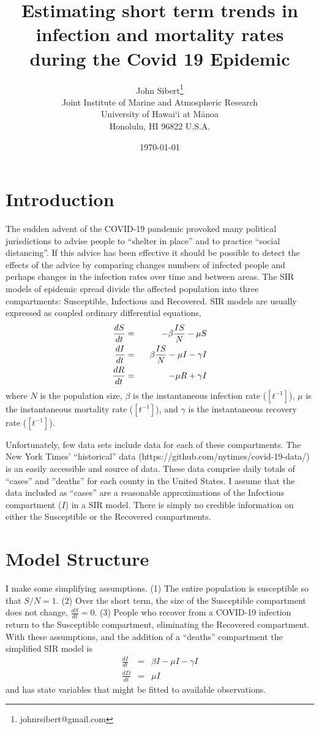 \documentclass[12pt,letterpaper]{article}
\title{Estimating short term trends in infection and mortality rates
during the Covid 19 Epidemic}
\author{
John Sibert\thanks{johnrsibert@gmail.com}\\
Joint Institute of Marine and Atmospheric Research\\
University of Hawai`i at M\={a}noa\\
Honolulu, HI  96822 U.S.A.\\[0.125in]
\date{\today}
}
\newcommand\doublespacing{\baselineskip=1.6\normalbaselineskip}
\begin{document}
\maketitle

\doublespacing

\section*{Introduction}

The sudden advent of the COVID-19 pandemic provoked many political
jurisdictions to advise people to ``shelter in place'' and to practice
``social distancing''. If this advice has been effective it should be
possible to detect the effects of the advice by comparing changes
numbers of infected people and perhaps changes in the infection rates
over time and
between areas. The SIR models of epidemic spread divide the affected
population into three compartments: 
Susceptible, Infectious and Recovered.
SIR models are
usually expressed as coupled ordinary differential equations,
\begin{eqnarray}
\label{eqn:SIR}
\frac{dS}{dt} &=& -\beta\frac{IS}{N} - \mu S\\
\frac{dI}{dt} &=& \hphantom{-}\beta\frac{IS}{N} - \mu I -\gamma I\\
\frac{dR}{dt} &=&  -\mu R +\gamma I
\end{eqnarray}
where $N$ is the population size, $\beta$ is the instantaneous
infection rate ($[t^{-1}]$), $\mu$ is the instantaneous mortality rate
($[t^{-1}]$),  and $\gamma$ is the instantaneous recovery rate
($[t^{-1}]$).  

Unfortunately, few data sets include data for each of
these compartments. 
The New York Times' ``historical'' data
(https://github.com/nytimes/covid-19-data/) is an
easily accessible and source of data. These
data comprise daily totals of ``cases'' and ''deaths'' for each county
in the United States. I assume that the data included as ``cases'' are
a reasonable approximations of the Infectious compartment ($I$) in a SIR model. 
There is simply no credible information on either the Susceptible or
the Recovered compartments.

\section*{Model Structure}
I make some simplifying assumptions. (1) The entire population is
susceptible so that $S/N = 1$. (2) Over the short term, the size of the
Susceptible compartment does not change, $\frac{dS}{dt} = 0$.
(3) People who recover from a COVID-19 infection return to the Susceptible
compartment, eliminating the Recovered compartment. 
With these assumptions, and the addition of a ``deaths''
compartment the simplified SIR model is
\begin{eqnarray}
\label{eqn:sSIR}
\frac{dI}{dt} &=&  \beta I - \mu I -\gamma I\\
\frac{dD}{dt} &=& \mu I
\end{eqnarray}
and has state variables that might be fitted to available observations.
\end{document}
